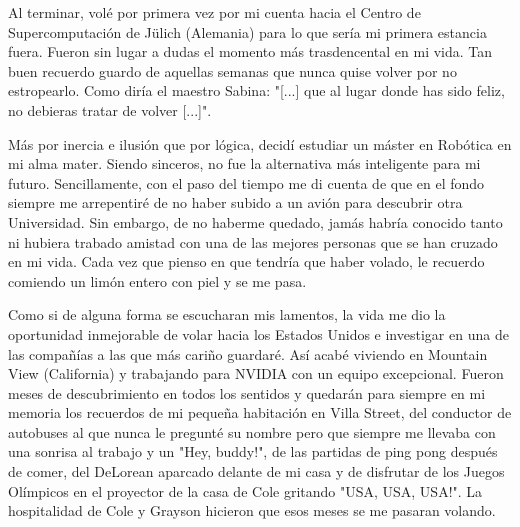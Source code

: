 Al terminar, volé por primera vez por mi cuenta hacia el Centro de Supercomputación de Jülich (Alemania) para lo que sería mi primera estancia fuera. Fueron sin lugar a dudas el momento más trasdencental en mi vida. Tan buen recuerdo guardo de aquellas semanas que nunca quise volver por no estropearlo. Como diría el maestro Sabina: "[...] que al lugar donde has sido feliz, no debieras tratar de volver [...]".

Más por inercia e ilusión que por lógica, decidí estudiar un máster en Robótica en mi alma mater. Siendo sinceros, no fue la alternativa más inteligente para mi futuro. Sencillamente, con el paso del tiempo me di cuenta de que en el fondo siempre me arrepentiré de no haber subido a un avión para descubrir otra Universidad. Sin embargo, de no haberme quedado, jamás habría conocido tanto ni hubiera trabado amistad con una de las mejores personas que se han cruzado en mi vida. Cada vez que pienso en que tendría que haber volado, le recuerdo comiendo un limón entero con piel y se me pasa.

Como si de alguna forma se escucharan mis lamentos, la vida me dio la oportunidad inmejorable de volar hacia los Estados Unidos e investigar en una de las compañías a las que más cariño guardaré. Así acabé viviendo en Mountain View (California) y trabajando para NVIDIA con un equipo excepcional. Fueron meses de descubrimiento en todos los sentidos y quedarán para siempre en mi memoria los recuerdos de mi pequeña habitación en Villa Street, del conductor de autobuses al que nunca le pregunté su nombre pero que siempre me llevaba con una sonrisa al trabajo y un "Hey, buddy!", de las partidas de ping pong después de comer, del DeLorean aparcado delante de mi casa y de disfrutar de los Juegos Olímpicos en el proyector de la casa de Cole gritando "USA, USA, USA!". La hospitalidad de Cole y Grayson hicieron que esos meses se me pasaran volando.

\newpage

